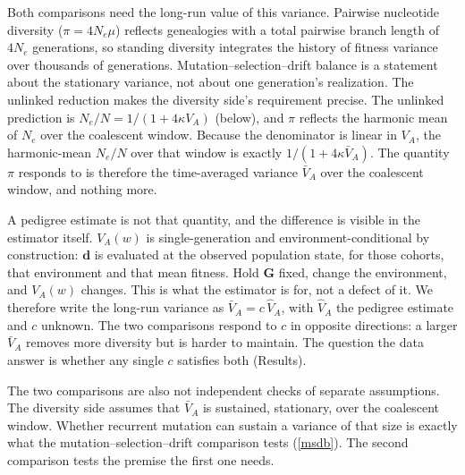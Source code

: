 \documentclass[12pt]{article}
\begin{document}
Both comparisons need the long-run value of this variance. Pairwise nucleotide diversity ($\pi = 4N_e\mu$) reflects genealogies with a total pairwise branch length of $4N_e$ generations, so standing diversity integrates the history of fitness variance over thousands of generations. Mutation--selection--drift balance is a statement about the stationary variance, not about one generation's realization. The unlinked reduction makes the diversity side's requirement precise. The unlinked prediction is $N_e/N = 1/(1 + 4\kappa V_A)$ (below), and $\pi$ reflects the harmonic mean of $N_e$ over the coalescent window. Because the denominator is linear in $V_A$, the harmonic-mean $N_e/N$ over that window is exactly $1/(1 + 4\kappa\bar{V}_A)$. The quantity $\pi$ responds to is therefore the time-averaged variance $\bar{V}_A$ over the coalescent window, and nothing more.

A pedigree estimate is not that quantity, and the difference is visible in the estimator itself. $V_A(w)$ is single-generation and environment-conditional by construction: $\mathbf{d}$ is evaluated at the observed population state, for those cohorts, that environment and that mean fitness. Hold $\mathbf{G}$ fixed, change the environment, and $V_A(w)$ changes. This is what the estimator is for, not a defect of it. We therefore write the long-run variance as $\bar{V}_A = c\,\hat{V}_A$, with $\hat{V}_A$ the pedigree estimate and $c$ unknown. The two comparisons respond to $c$ in opposite directions: a larger $\bar{V}_A$ removes more diversity but is harder to maintain. The question the data answer is whether any single $c$ satisfies both (Results).

The two comparisons are also not independent checks of separate assumptions. The diversity side assumes that $\bar{V}_A$ is sustained, stationary, over the coalescent window. Whether recurrent mutation can sustain a variance of that size is exactly what the mutation--selection--drift comparison tests (\autoref{msdb}). The second comparison tests the premise the first one needs.
\end{document}

